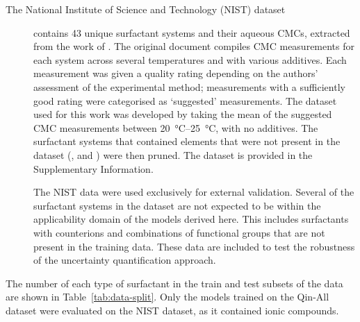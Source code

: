 \begin{description}
    \item[The National Institute of Science and Technology (NIST) dataset]
          contains 43 unique surfactant systems and their aqueous CMCs,
          extracted from the work of
          \citet{mukerjeeCriticalMicelleConcentrations1971}. The original
          document compiles CMC measurements for each system across several
          temperatures and with various additives. Each measurement was given a
          quality rating depending on the authors' assessment of the
          experimental method; measurements with a sufficiently good rating were
          categorised as `suggested' measurements. The dataset used for this
          work was developed by taking the mean of the suggested CMC
          measurements between \SIrange{20}{25}{\degreeCelsius}, with no
          additives. The surfactant systems that contained elements that were
          not present in the dataset (,  and ) were then
          pruned. The dataset is provided in the Supplementary Information.

          The NIST data were used exclusively for external validation. Several
          of the surfactant systems in the dataset are not expected to be within
          the applicability domain of the models derived here. This includes
          surfactants with counterions and combinations of functional groups
          that are not present in the training data. These data are included to
          test the robustness of the uncertainty quantification approach.
\end{description}

The number of each type of surfactant in the train and test subsets of the data are shown in Table~\ref{tab:data-split}. Only the models trained on the Qin-All dataset were evaluated on the NIST dataset, as it contained ionic compounds.

